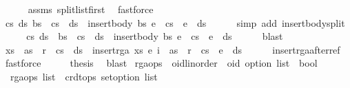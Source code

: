 \begin{isabellebody}
\ \ \ \ \isamarkupfalse%
\ assms{\isacharparenleft}{}{\isacharparenright}\ split{\isacharunderscore}list{\isacharunderscore}first\ \isamarkupfalse%
\ fastforce\isanewline
\ \ \isamarkupfalse%
\ \isamarkupfalse%
\ {\isachardoublequoteopen}{\isasymexists}cs\ ds{\isachardot}\ bs\ {\isacharequal}\ cs\ {\isacharat}\ ds\ {\isasymand}\ insert{\isacharunderscore}body\ bs\ e\ {\isacharequal}\ cs\ {\isacharat}\ e\ {\isacharhash}\ ds{\isachardoublequoteclose}\isanewline
\ \ \ \ \isamarkupfalse%
\ {\isacharparenleft}simp\ add{\isacharcolon}\ insert{\isacharunderscore}body{\isacharunderscore}split{\isacharparenright}\isanewline
\ \ \isamarkupfalse%
\ \isamarkupfalse%
\ cs\ ds\ \ {\isachardoublequoteopen}bs\ {\isacharequal}\ cs\ {\isacharat}\ ds\ {\isasymand}\ insert{\isacharunderscore}body\ bs\ e\ {\isacharequal}\ cs\ {\isacharat}\ e\ {\isacharhash}\ ds{\isachardoublequoteclose}\isanewline
\ \ \ \ \isamarkupfalse%
\ blast\isanewline
\ \ \isamarkupfalse%
\ \isamarkupfalse%
\ {\isachardoublequoteopen}xs\ {\isacharequal}\ {\isacharparenleft}as\ {\isacharat}\ r\ {\isacharhash}\ cs{\isacharparenright}\ {\isacharat}\ ds\ {\isasymand}\ insert{\isacharunderscore}rga\ xs\ {\isacharparenleft}e{\isacharcomma}\ i{\isacharparenright}\ {\isacharequal}\ {\isacharparenleft}as\ {\isacharat}\ r\ {\isacharhash}\ cs{\isacharparenright}\ {\isacharat}\ e\ {\isacharhash}\ ds{\isachardoublequoteclose}\isanewline
\ \ \ \ \isamarkupfalse%
\ insert{\isacharunderscore}rga{\isacharunderscore}after{\isacharunderscore}ref\ \isamarkupfalse%
\ fastforce\isanewline
\ \ \isamarkupfalse%
\ \isamarkupfalse%
\ {\isacharquery}thesis\ \isamarkupfalse%
\ blast\isanewline
{}\isamarkupfalse%
%
\endisatagproof
{\isafoldproof}%
%
\isadelimproof
%
\endisadelimproof
%
\isamarkuptrue%
\isamarkupfalse%
\ rga{\isacharunderscore}ops\ {\isacharcolon}{\isacharcolon}\ {\isachardoublequoteopen}{\isacharparenleft}{\isacharprime}oid{\isacharcolon}{\isacharcolon}{\isacharbraceleft}linorder{\isacharbraceright}\ {\isasymtimes}\ {\isacharprime}oid\ option{\isacharparenright}\ list\ {\isasymRightarrow}\ bool{\isachardoublequoteclose}\ \isanewline
\ \ {\isachardoublequoteopen}rga{\isacharunderscore}ops\ list\ {\isasymequiv}\ crdt{\isacharunderscore}ops\ set{\isacharunderscore}option\ list{\isachardoublequoteclose}\isanewline

\end{isabellebody}
